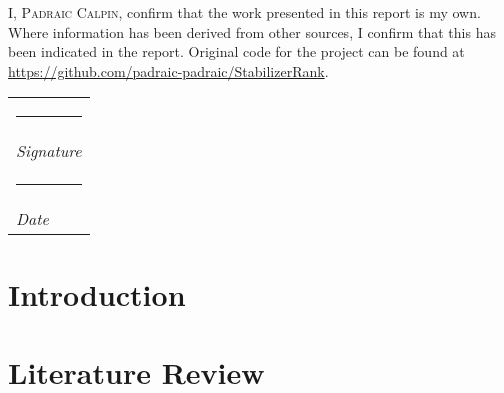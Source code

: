 \documentclass[11pt,a4paper,twoside]{report}
\theoremstyle{plain}%
\theoremstyle{definition}
\theoremstyle{remark}
\begin{document}

\restoregeometry 
\pagestyle{fancy}  %
\fancyhead{} %
\fancyhead[RO,LE]{\thepage} %
\fancyhead[LO]{\slshape\rightmark}
\cfoot{}
\makeatletter
\renewcommand{\chaptermark}[1]{%
  \markboth{}{\MakeUppercase{%
    \ifnum\c@secnumdepth>\m@ne \thechapter. \ \fi #1}}%
}
\makeatother
\begin{abstract}
   
\end{abstract}
\tableofcontents
\pagebreak
\newcommand\Declaration[1]{
\thispagestyle{plain}
    \null\vfil
{\normalsize #1}
\vfil\vfil\null
}
\newcommand{\namesigdate}[2][5cm]{%
  \begin{tabular}{@{}p{#1}@{}}
    #2 \\[\normalbaselineskip] \hrule \\[0pt]
    {\small \textit{Signature}} \\[\normalbaselineskip] \hrule \\[0pt]
    {\small \textit{Date}}
  \end{tabular}
}
\Declaration{
I, \textsc{Padraic Calpin}, confirm that the work presented in this report is
my own.
Where information has been derived from other sources, I confirm that this has been
indicated in the report. Original code for the project can be found at \url{https://github.com/padraic-padraic/StabilizerRank}.

\begin{flushright}
  \namesigdate[2.5in]{}
\end{flushright}
}
\chapter{Introduction}\label{chap:intro}

\chapter{Literature Review}\label{chap:litreview}

\end{document}

